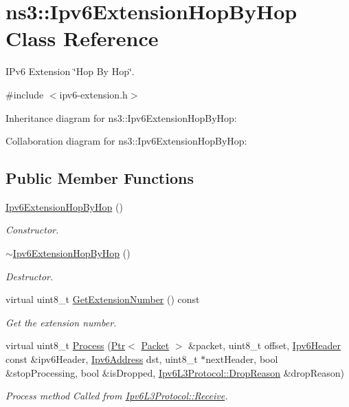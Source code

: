 \hypertarget{classns3_1_1Ipv6ExtensionHopByHop}{}\section{ns3\+:\+:Ipv6\+Extension\+Hop\+By\+Hop Class Reference}
\label{classns3_1_1Ipv6ExtensionHopByHop}


I\+Pv6 Extension \char`\"{}\+Hop By Hop\char`\"{}.  




{\ttfamily \#include $<$ipv6-\/extension.\+h$>$}



Inheritance diagram for ns3\+:\+:Ipv6\+Extension\+Hop\+By\+Hop\+:


Collaboration diagram for ns3\+:\+:Ipv6\+Extension\+Hop\+By\+Hop\+:
\subsection*{Public Member Functions}
\begin{DoxyCompactItemize}
\item 
\hyperlink{classns3_1_1Ipv6ExtensionHopByHop_abd04c4daa93e493fd951d68aa2caf65f}{Ipv6\+Extension\+Hop\+By\+Hop} ()
\begin{DoxyCompactList}\small\item\em Constructor. \end{DoxyCompactList}\item 
\hyperlink{classns3_1_1Ipv6ExtensionHopByHop_ab6684fd81a317accf8eb2de81c97c9c3}{$\sim$\+Ipv6\+Extension\+Hop\+By\+Hop} ()
\begin{DoxyCompactList}\small\item\em Destructor. \end{DoxyCompactList}\item 
virtual uint8\+\_\+t \hyperlink{classns3_1_1Ipv6ExtensionHopByHop_ac304e3ed0cd24a3fa5b65b94a01c1eb6}{Get\+Extension\+Number} () const 
\begin{DoxyCompactList}\small\item\em Get the extension number. \end{DoxyCompactList}\item 
virtual uint8\+\_\+t \hyperlink{classns3_1_1Ipv6ExtensionHopByHop_a234507e921675c3e30d8e5ddf7108c77}{Process} (\hyperlink{classns3_1_1Ptr}{Ptr}$<$ \hyperlink{classns3_1_1Packet}{Packet} $>$ \&packet, uint8\+\_\+t offset, \hyperlink{classns3_1_1Ipv6Header}{Ipv6\+Header} const \&ipv6\+Header, \hyperlink{classns3_1_1Ipv6Address}{Ipv6\+Address} dst, uint8\+\_\+t $\ast$next\+Header, bool \&stop\+Processing, bool \&is\+Dropped, \hyperlink{classns3_1_1Ipv6L3Protocol_a33c64db9bc35f71ff368b132bfffa37a}{Ipv6\+L3\+Protocol\+::\+Drop\+Reason} \&drop\+Reason)
\begin{DoxyCompactList}\small\item\em Process method Called from \hyperlink{classns3_1_1Ipv6L3Protocol_a8a95d576e8aee9a571db93bf686d850a}{Ipv6\+L3\+Protocol\+::\+Receive}. \end{DoxyCompactList}\end{DoxyCompactItemize}
